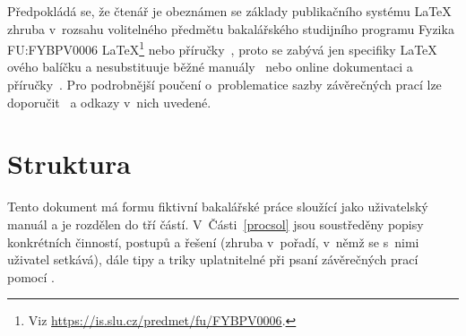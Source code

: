 Předpokládá se, že čtenář je obeznámen se základy publikačního
systému \LaTeX{}
zhruba v~rozsahu volitelného předmětu bakalářského studijního programu Fyzika
FU:FYBPV0006 \LaTeX{}\footnote{Viz
  \url{https://is.slu.cz/predmet/fu/FYBPV0006}.} nebo
příručky~\cite{Ryb:2005:LaTeX:3}, proto se zabývá jen specifiky \LaTeX
ového balíčku \pkg{\ipotname} a
nesubstituuje běžné manuály~\cite{Ryb:2005:LaTeX:3,%
  Lam:1994:LaTeX:,%
  Goo-Mit-Sam:1994:Companion:,%
  Goo-Rah-Mit:1994:GraComp:,%
  Goo-Rah:1994:WebComp:,%
  Kop-Dal:2004:LaTeXPodrPruv:,%
  Wri-Fai-etal:LIVE::TeXFAQ} nebo online dokumentaci a
příručky~\cite{Oet-etal:LIVE::lshort,%
  Hle:LIVE::Bazak}.  Pro podrobnější poučení o~problematice sazby závěrečných
prací lze doporučit~\cite{Pol:1998:PravidlaSazbyDP:,%
  Ryb:2006:ZpracZP:} a odkazy v~nich uvedené.

\section*{Struktura}\label{struct}

Tento dokument má formu fiktivní bakalářské práce sloužící jako uživatelský
manuál a je rozdělen do tří částí. V~Části~\ref{procsol} jsou soustředěny
popisy konkrétních činností, postupů a řešení (zhruba v~pořadí, v~němž se
s~nimi uživatel setkává), dále tipy a triky uplatnitelné při psaní závěrečných
prací pomocí \pkg{\ipotname}.

